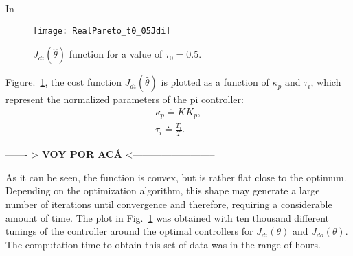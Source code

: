 In %
\begin{figure}[tb]%
	\centering
	\texttt{[image: RealPareto\_t0\_05Jdi]}%
	\caption{$J_{di}(\hat{\theta})$ function for a value of $\tau_0=0.5$.}%
	\label{fig:RealPareto_t0_05Jdi}%
\end{figure}
%
%
Figure.~\ref{fig:RealPareto_t0_05Jdi}, the cost function $J_{di}(\hat{\theta})$ is plotted as a function of $\kappa_p$ and $\tau_i$, which represent the normalized parameters of the \gls{pi} controller:
\begin{equation}
\begin{array}{c}
\kappa_p \doteq K K_p,\\
\tau_i \doteq \frac{T_i}{T}.
\end{array}
\label{eq:NormContrParam}
\end{equation}


------- > \textbf{VOY POR ACÁ} <--------------------------


As it can be seen, the function is convex, but is rather flat close to the optimum. Depending on the optimization algorithm, this shape may generate a large number of iterations until convergence and therefore, requiring a considerable amount of time. The plot in Fig.~\ref{fig:RealPareto_t0_05Jdi} was obtained with ten thousand different tunings of the controller around the optimal controllers for $J_{di}(\theta)$ and $J_{do}(\theta)$. The computation time to obtain this set of data was in the range of hours. %
%

